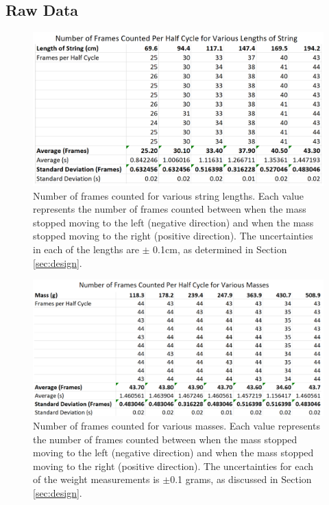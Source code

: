 \documentclass[11pt]{article}
\begin{document}
    \subsection{Raw Data}\label{app:RawData}

    \begin{figure}[H]
        \includegraphics[width = \textwidth]{RawStringLengths.PNG}
        \caption
        {Number of frames counted for various string lengths. Each value represents the number of frames counted between when the mass stopped moving to the left (negative direction) and when the mass stopped moving to the right (positive direction). The uncertainties in each of the lengths are $\pm$ 0.1cm, as determined in Section \ref{sec:design}.
        \label{fig:RawStringLengths}
        }   
    \end{figure}
    
    \begin{figure}[H]
        \includegraphics[width = \textwidth]{RawMasses.PNG}
        \caption{
        Number of frames counted for various masses. Each value represents the number of frames counted between when the mass stopped moving to the left (negative direction) and when the mass stopped moving to the right (positive direction). The uncertainties for each of the weight measurements is $\pm$0.1 grams, as discussed in Section \ref{sec:design}.
        \label{fig:RawMasses}
        }   
    \end{figure}


    
    
\end{document}

